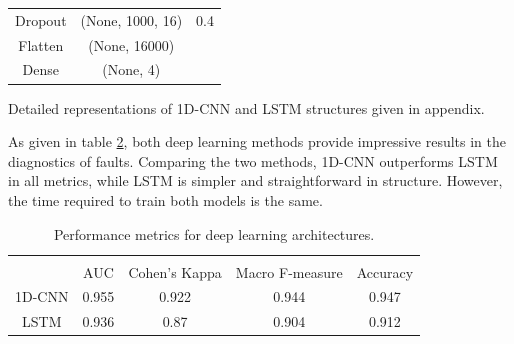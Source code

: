 \begin{table}[h]
{\begin{center}
\begin{tabular}{ccc}
			Dropout            & (None, 1000, 16) & 0.4                                                                                                          \\
			Flatten            & (None, 16000)    &                                                                                                              \\
			Dense              & (None, 4)        &           \\                                                                                                  				
				\hline
			\end{tabular}
			\vspace{-6mm}
		\end{center}}
		\label{lstm}
\end{table}

Detailed representations of 1D-CNN and LSTM structures given in appendix. 

As given in table \ref{deepl}, both deep learning methods provide impressive results in the diagnostics of faults. Comparing the two methods, 1D-CNN outperforms LSTM in all metrics, while LSTM is simpler and straightforward in structure. However, the time required to train both models is the same.

\begin{table}[h]
	{\setlength{\tabcolsep}{12pt}
 		\caption{Performance metrics for deep learning architectures.}
 		\begin{center}
 			\vspace{-6mm}
			\begin{tabular}{c|cccc}
				\hline \\[-2.45ex] \hline \\[-2.1ex]
				& AUC   & Cohen's Kappa & Macro F-measure & Accuracy \\

				\hline

			1D-CNN & 0.955 & 0.922         & 0.944           & 0.947    \\

			LSTM   & 0.936 & 0.87          & 0.904           & 0.912   \\
				\hline
			\end{tabular}
			\vspace{-6mm}
		\end{center}
		\label{deepl}}
\end{table}


